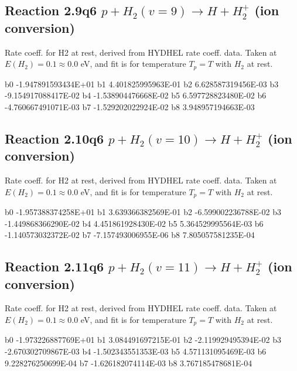 \newpage
\subsection{
Reaction 2.9q6
$ p + H_2(v=9) \rightarrow H + H_2^+$ (ion conversion)
}
Rate coeff. for H2 at rest, derived from HYDHEL rate coeff. data.
Taken at $E(H_2) = 0.1 \approx 0.0$ eV,  and fit is for temperature $T_p=T$ with $H_2$ at rest.

\begin{{small}}\begin{{verbatim}}

  b0 -1.947891593434E+01  b1  4.401825995963E-01  b2  6.628587319456E-03
  b3 -9.154917088417E-02  b4 -1.538904476668E-02  b5  6.597728823480E-02
  b6 -4.760667491071E-03  b7 -1.529202022924E-02  b8  3.948957194663E-03

\end{{verbatim}}\end{{small}}

\newpage
\subsection{
Reaction 2.10q6
$ p + H_2(v=10) \rightarrow H + H_2^+$ (ion conversion)
}
Rate coeff. for H2 at rest, derived from HYDHEL rate coeff. data.
Taken at $E(H_2) = 0.1 \approx 0.0$ eV,  and fit is for temperature $T_p=T$ with $H_2$ at rest.

\begin{{small}}\begin{{verbatim}}

  b0 -1.957388374258E+01  b1  3.639366382569E-01  b2 -6.599002236788E-02
  b3 -1.449868366290E-02  b4  4.451861928430E-02  b5  5.364529995564E-03
  b6 -1.140573032372E-02  b7 -7.157493006955E-06  b8  7.805057581235E-04

\end{{verbatim}}\end{{small}}

\newpage
\subsection{
Reaction 2.11q6
$ p + H_2(v=11) \rightarrow H + H_2^+$ (ion conversion)
}
Rate coeff. for H2 at rest, derived from HYDHEL rate coeff. data.
Taken at $E(H_2) = 0.1 \approx 0.0$ eV,  and fit is for temperature $T_p=T$ with $H_2$ at rest.

\begin{{small}}\begin{{verbatim}}

  b0 -1.973226887769E+01  b1  3.084491697215E-01  b2 -2.119929495394E-02
  b3 -2.670302709867E-03  b4 -1.502343551353E-03  b5  4.571131095469E-03
  b6  9.228276250699E-04  b7 -1.626182074114E-03  b8  3.767185478681E-04

\end{{verbatim}}\end{{small}}

